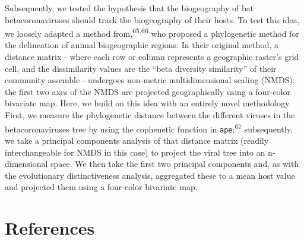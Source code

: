 \documentclass[11pt]{article}
\begin{document}
Subsequently, we tested the hypothesis that the biogeography of bat
betacoronaviruses should track the biogeography of their hosts. To test
this idea, we loosely adapted a method from,\textsuperscript{65,66} who
proposed a phylogenetic method for the delineation of animal
biogeographic regions. In their original method, a distance matrix -
where each row or column represents a geographic raster's grid cell, and
the dissimilarity values are the ``beta diversity similarity'' of their
community assemble - undergoes non-metric multidimensional scaling
(NMDS); the first two axes of the NMDS are projected geographically
using a four-color bivariate map. Here, we build on this idea with an
entirely novel methodology. First, we measure the phylogenetic distance
between the different viruses in the betacoronaviruses tree by using the
cophenetic function in \texttt{ape};\textsuperscript{67} subsequently,
we take a principal components analysis of that distance matrix (readily
interchangeable for NMDS in this case) to project the viral tree into an
n-dimensional space. We then take the first two principal components
and, as with the evolutionary distinctiveness analysis, aggregated these
to a mean host value and projected them using a four-color bivariate
map.

\newpage

\hypertarget{references}{%
\section*{References}\label{references}}
\end{document}
